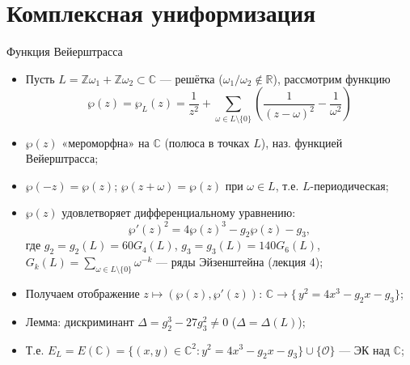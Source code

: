 \documentclass[serif, aspectratio=169]{beamer}
\begin{document}
\section{Комплексная униформизация}

\begin{frame}{Функция Вейерштрасса}
    \begin{itemize}
        \item Пусть $L=\mathbb{Z}\omega_1+\mathbb{Z}\omega_2\subset\mathbb{C}$ --- решётка ($\omega_1/\omega_2\notin\mathbb{R}$), рассмотрим функцию
        \[\wp(z)=\wp_L(z)=\frac1{z^2}+\sum_{\omega\in L\setminus\{0\}}\left(\frac1{(z-\omega)^2}-\frac1{\omega^2}\right)\]
        \item $\wp(z)$ «мероморфна» на $\mathbb{C}$ (полюса в точках $L$), наз. функцией Вейерштрасса;
        \item $\wp(-z)=\wp(z)$; $\wp(z+\omega)=\wp(z)$ при $\omega\in L$, т.е. $L$-периодическая;
        \item $\wp(z)$ удовлетворяет дифференциальному уравнению:
        \[\wp'(z)^2=4\wp(z)^3-g_2\wp(z)-g_3,\]
        где $g_2=g_2(L)=60G_4(L)$, $g_3=g_3(L)=140G_6(L)$,\\ $G_k(L)=\sum_{\omega\in L\setminus\{0\}}\omega^{-k}$ --- ряды Эйзенштейна (лекция 4);
        \item Получаем отображение $z\mapsto(\wp(z),\wp'(z))$: $\mathbb{C} \to \{\,y^2=4x^3-g_2x-g_3\}$;
        \item Лемма: дискриминант $\Delta=g_2^3-27g_3^2\ne0$ ($\Delta=\Delta(L)$);
        \item Т.е. $E_L=E(\mathbb{C})=\{(x,y)\in\mathbb{C}^2: y^2=4x^3-g_2x-g_3\}\cup\{\mathcal{O}\}$ --- ЭК над $\mathbb{C}$;
    \end{itemize}
\end{frame}
\end{document}
